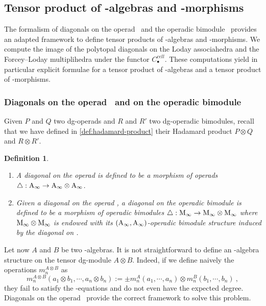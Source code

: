 \documentclass[twoside, 12pt]{amsart}
\newtheorem{definition}{Definition}[section]
\theoremstyle{remark}
\begin{document}
\subsection{Tensor product of \Ainf -algebras and \Ainf -morphisms}

The formalism of diagonals on the operad \Ainf\ and the operadic bimodule \Minf\ provides an adapted framework to define tensor products of \Ainf -algebras and \Ainf -morphisms.
We compute the image of the polytopal diagonals on the Loday associahedra and the Forcey--Loday multiplihedra under the functor $C_\bullet^{cell}$. These computations yield in particular explicit formulae for a tensor product of \Ainf -algebras and a tensor product of \Ainf -morphisms.

\subsubsection{Diagonals on the operad \Ainf\ and on the operadic bimodule \Minf}

Given $P$ and $Q$ two dg-operads and $R$ and $R'$ two dg-operadic bimodules, recall that we have defined in \cref{def:hadamard-product} their Hadamard product $P \otimes Q$ and $R \otimes R'$.

\begin{definition}
\begin{enumerate}[leftmargin=*]
    \item A \emph{diagonal on the operad \Ainf} is defined to be a morphism of operads $\triangle : \mathrm{A}_\infty \rightarrow \mathrm{A}_\infty \otimes \mathrm{A}_\infty$. 
    \item Given a diagonal on the operad \Ainf, a \emph{diagonal on the operadic bimodule \Minf} is defined to be a morphism of operadic bimodules $\triangle : \mathrm{M}_\infty \rightarrow \mathrm{M}_\infty \otimes \mathrm{M}_\infty$ where $\mathrm{M}_\infty \otimes \mathrm{M}_\infty$ is endowed with its $(\mathrm{A}_\infty , \mathrm{A}_\infty)$-operadic bimodule structure induced by the diagonal on \Ainf .
\end{enumerate}
\end{definition}

Let now $A$ and $B$ be two \Ainf -algebras. It is not straightforward to define an \Ainf -algebra structure on the tensor dg-module $A \otimes B$. Indeed, if we define naively the operations $m_n^{A \otimes B}$ as \[ m_n^{A \otimes B}(a_1 \otimes b_1 , \cdots , a_n \otimes b_n) := \pm m_n^A(a_1 , \cdots , a_n) \otimes m_n^B (b_1 , \cdots , b_n) \ , \]
they fail to satisfy the \Ainf -equations and do not even have the expected degree.
Diagonals on the operad \Ainf\ provide the correct framework to solve this problem.
\end{document}
